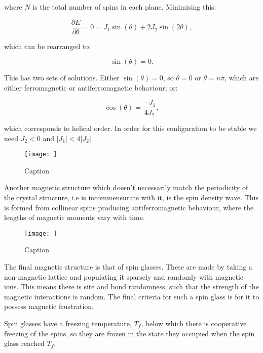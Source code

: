 \noindent where $N$ is the total number of spins in each plane. Minimising this:

\begin{equation}
    \frac{\partial E}{\partial \theta} = 0 = J_1 \sin(\theta) + 2J_2 \sin(2\theta),
    \label{MinimisedHelicalOrderEnergy}
\end{equation}

\noindent which can be rearranged to:

\begin{equation}
    [J_1 + 4J_2\cos(\theta)] \sin(\theta) = 0.
    \label{RearrangedMinimisedHelicalOrderEnergy}
\end{equation}

\noindent This has two sets of solutions. Either $\sin(\theta) = 0$, so $\theta = 0$ or $\theta = n\pi$, which are either ferromagnetic  or antiferromagnetic behaviour; or:

\begin{equation}
    \cos(\theta) = \frac{-J_1}{4J_2},
    \label{HelicalOrderCondition}
\end{equation}

\noindent which corresponds to helical order. In order for this configuration to be stable we need $J_2 < 0$ and $|J_1| < 4|J_2|$.

\begin{figure}
    \centering
    \texttt{[image: ]}
    \caption{Caption}
    \label{fig:enter-label}
\end{figure}

\noindent Another magnetic structure which doesn't necessarily match the periodicity of the crystal structure, i.e is incommensurate with it, is the spin density wave. This is formed from collinear spins producing antiferromagnetic behaviour, where the lengths of magnetic moments vary with time.

\begin{figure}
    \centering
    \texttt{[image: ]}
    \caption{Caption}
    \label{fig:enter-label}
\end{figure}

\noindent The final magnetic structure is that of spin glasses. These are made by taking a non-magnetic lattice and populating it sparsely and randomly with magnetic ions. This means there is site and bond randomness, such that the strength of the magnetic interactions is random. The final criteria for such a spin glass is for it to possess magnetic frustration.

\noindent Spin glasses have a freezing temperature, $T_f$, below which there is cooperative freezing of the spins, so they are frozen in the state they occupied when the spin glass reached $T_f$.

